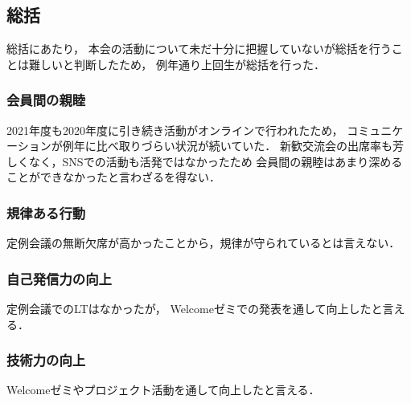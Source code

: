 \subsection*{\firstGrade{}総括}


\firstGrade{}総括にあたり，
本会の活動について未だ十分に把握していない\firstGrade{}が総括を行うことは難しいと判断したため，
例年通り上回生が総括を行った．

\subsubsection*{会員間の親睦}
2021年度も2020年度に引き続き活動がオンラインで行われたため，
コミュニケーションが例年に比べ取りづらい状況が続いていた．
新歓交流会の出席率も芳しくなく，SNSでの活動も活発ではなかったため
会員間の親睦はあまり深めることができなかったと言わざるを得ない．

\subsubsection*{規律ある行動}
定例会議の無断欠席が高かったことから，規律が守られているとは言えない．

\subsubsection*{自己発信力の向上}
定例会議でのLTはなかったが，
Welcomeゼミでの発表を通して向上したと言える．

\subsubsection*{技術力の向上}
Welcomeゼミやプロジェクト活動を通して向上したと言える．
